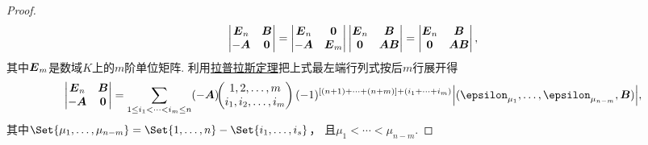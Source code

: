 \begin{theorem}
\begin{proof}
\begin{equation*}
	\begin{vmatrix}
		\boldsymbol{E}_n & \boldsymbol{B} \\
		-\boldsymbol{A} & \boldsymbol0
	\end{vmatrix}
	= \begin{vmatrix}
		\boldsymbol{E}_n & \boldsymbol0 \\
		-\boldsymbol{A} & \boldsymbol{E}_m
	\end{vmatrix} \begin{vmatrix}
		\boldsymbol{E}_n & \boldsymbol{B} \\
		\boldsymbol0 & \boldsymbol{A}\boldsymbol{B}
	\end{vmatrix}
	= \begin{vmatrix}
		\boldsymbol{E}_n & \boldsymbol{B} \\
		\boldsymbol0 & \boldsymbol{A}\boldsymbol{B}
	\end{vmatrix},
\end{equation*}
其中\(\boldsymbol{E}_m\)是数域\(K\)上的\(m\)阶单位矩阵.
利用\hyperref[theorem:行列式.拉普拉斯定理]{拉普拉斯定理}把上式最左端行列式按后\(m\)行展开得\begin{equation*}
	\begin{vmatrix}
		\vb{E}_n & \vb{B} \\
		-\vb{A} & \vb0
	\end{vmatrix}
	= \sum_{1 \leq i_1 < \dotsb < i_m \leq n}
	\MatrixMinor{(-\vb{A})}{
		1,2,\dotsc,m \\
		i_1,i_2,\dotsc,i_m
	}
	(-1)^{[(n+1)+\dotsb+(n+m)]+(i_1+\dotsb+i_m)}
	\abs{(\vb\epsilon_{\mu_1},\dotsc,\vb\epsilon_{\mu_{n-m}},\vb{B})},
\end{equation*}
其中\(\Set{\mu_1,\dotsc,\mu_{n-m}}
= \Set{1,\dotsc,n}-\Set{i_1,\dotsc,i_s}\)，
且\(\mu_1<\dotsb<\mu_{n-m}\).


\end{proof}
\end{theorem}
